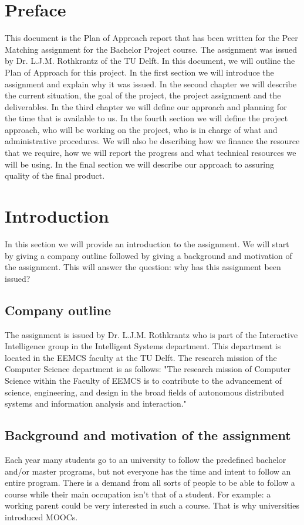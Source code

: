 \section*{Preface}
This document is the Plan of Approach report that has been written for the Peer Matching assignment for the Bachelor Project course.
The assignment was issued by Dr. L.J.M. Rothkrantz of the TU Delft.
In this document, we will outline the Plan of Approach for this project.
In the first section we will introduce the assignment and explain why it was issued.
In the second chapter we will describe the current situation, the goal of the project, the project assignment and the deliverables.
In the third chapter we will define our approach and planning for the time that is available to us.
In the fourth section we will define the project approach, who will be working on the project, who is in charge of what and administrative procedures.
We will also be describing how we finance the  resource that we require, how we will report the progress and what technical resources we will be using.
In the final section we will describe our approach to assuring quality of the final product.
\section*{Introduction}
In this section we will provide an introduction to the assignment.
We will start by giving a company outline followed by giving a background and motivation of the assignment.
This will answer the question: why has this assignment been issued? 
\subsection*{Company outline}
The assignment is issued by Dr. L.J.M. Rothkrantz who is part of the Interactive Intelligence group in the Intelligent Systems department.
This department is located in the EEMCS faculty at the TU Delft.
The research mission of the Computer Science department is as follows:
"The research mission of Computer Science within the Faculty of EEMCS is to contribute to the advancement of science, engineering, and design in the broad fields of autonomous distributed systems and information analysis and interaction."\cite{cstudelftnl}

\subsection*{Background and motivation of the assignment}
Each year many students go to an university to follow the predefined bachelor and/or master programs, but not everyone has the time and intent to follow an entire program.
There is a demand from all sorts of people to be able to follow a course while their main occupation isn't that of a student.
For example: a working parent could be very interested in such a course.
That is why universities introduced MOOCs.


